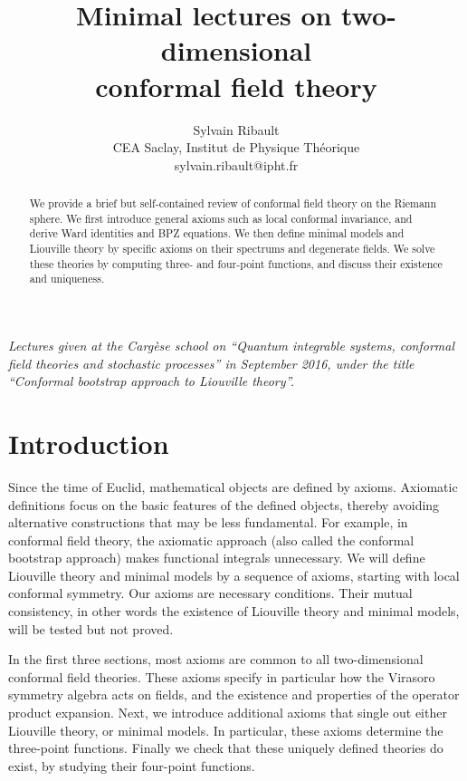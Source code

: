 \documentclass[12pt, a4paper]{article}
\title{\bfseries Minimal lectures on two-dimensional \\ conformal field theory}
\author{Sylvain Ribault \vspace{2mm}
\\
{\normalsize CEA Saclay, Institut de Physique Th\'eorique}
 \\
 {\footnotesize \ttfamily sylvain.ribault@ipht.fr }
}
\theoremstyle{break}
\begin{document}
\maketitle


\begin{abstract}
We provide a brief but self-contained review of conformal field theory on the Riemann sphere. We first introduce general axioms such as local conformal invariance, and derive Ward identities and BPZ equations. We then define minimal models and  Liouville theory by specific axioms on their spectrums and degenerate fields. We solve these theories by computing 
three- and four-point functions, and discuss their existence and uniqueness. 
\end{abstract}

\vspace{5mm}

 \noindent\textit{Lectures given at the Carg\`ese school on ``Quantum integrable systems, conformal field theories and stochastic processes'' in September 2016, under the title ``Conformal bootstrap approach to Liouville theory''.}



\clearpage

\tableofcontents

\hypersetup{linkcolor=blue}

\setcounter{section}{-1}

\section{Introduction}

Since the time of Euclid, mathematical objects are defined by axioms. 
Axiomatic definitions focus on the basic features of the defined objects, thereby avoiding alternative constructions that may be less fundamental.
For example, in conformal field theory, the axiomatic approach (also called the conformal bootstrap approach) makes functional integrals unnecessary.
We will define Liouville theory and minimal models by a sequence of axioms, starting with local conformal symmetry. 
Our axioms are necessary conditions. 
Their mutual consistency, in other words the existence of Liouville theory and minimal models, will be tested but not proved.

In the first three sections, most axioms are common to all two-dimensional conformal field theories.
These axioms specify in particular how the Virasoro symmetry algebra acts on fields, and the existence and properties of the operator product expansion. 
Next, we introduce additional axioms that single out either Liouville theory, or minimal models.
In particular, these axioms determine the three-point functions. 
Finally we check that these uniquely defined theories do exist, by studying their four-point functions.
\end{document}
